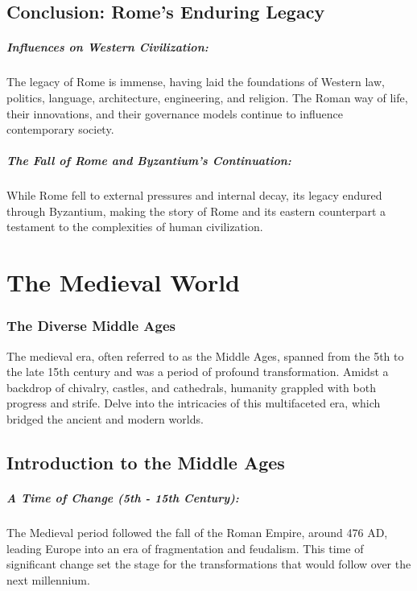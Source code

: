 \documentclass[a4paper,12pt]{book}
\begin{document}
\section*{Conclusion: Rome's Enduring Legacy}

\paragraph{Influences on Western Civilization:}
The legacy of Rome is immense, having laid the foundations of Western law, politics, language, architecture, engineering, and religion. The Roman way of life, their innovations, and their governance models continue to influence contemporary society.

\paragraph{The Fall of Rome and Byzantium’s Continuation:}
While Rome fell to external pressures and internal decay, its legacy endured through Byzantium, making the story of Rome and its eastern counterpart a testament to the complexities of human civilization.

\chapter{The Medieval World}
\subsection*{The Diverse Middle Ages}
The medieval era, often referred to as the Middle Ages, spanned from the 5th to the late 15th century and was a period of profound transformation. Amidst a backdrop of chivalry, castles, and cathedrals, humanity grappled with both progress and strife. Delve into the intricacies of this multifaceted era, which bridged the ancient and modern worlds.

\section*{Introduction to the Middle Ages}

\paragraph{A Time of Change (5th - 15th Century):}
The Medieval period followed the fall of the Roman Empire, around 476 AD, leading Europe into an era of fragmentation and feudalism. This time of significant change set the stage for the transformations that would follow over the next millennium.
\end{document}
